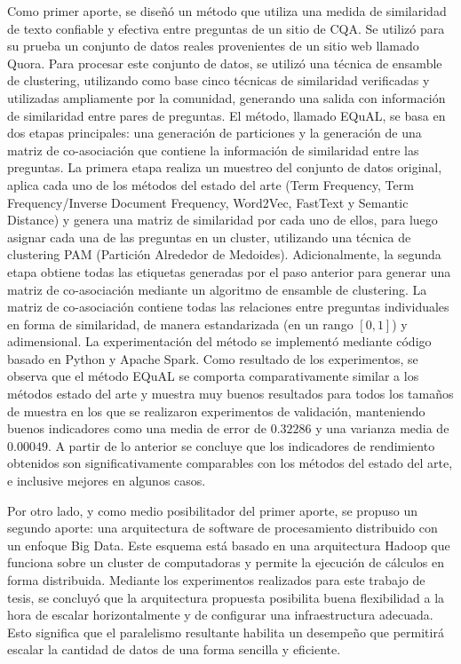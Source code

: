 \bigskip Como primer aporte, se diseñó un método que utiliza una medida de similaridad de texto confiable y efectiva entre preguntas de un sitio de CQA. Se utilizó para su prueba un conjunto de datos reales provenientes de un sitio web llamado Quora. Para procesar este conjunto de datos, se utilizó una técnica de ensamble de clustering, utilizando como base cinco técnicas de similaridad verificadas y utilizadas ampliamente por la comunidad, generando una salida con información de similaridad entre pares de preguntas. El método, llamado EQuAL, se basa en dos etapas principales: una generación de particiones y la generación de una matriz de co-asociación que contiene la información de similaridad entre las preguntas. La primera etapa realiza un muestreo del conjunto de datos original, aplica cada uno de los métodos del estado del arte (Term Frequency, Term Frequency/Inverse Document Frequency, Word2Vec, FastText y Semantic Distance) y genera una matriz de similaridad por cada uno de ellos, para luego asignar cada una de las preguntas en un cluster, utilizando una técnica de clustering PAM (Partición Alrededor de Medoides). Adicionalmente, la segunda etapa obtiene todas las etiquetas generadas por el paso anterior para generar una matriz de co-asociación mediante un algoritmo de ensamble de clustering. La matriz de co-asociación contiene todas las relaciones entre preguntas individuales en forma de similaridad, de manera estandarizada (en un rango \([0,1]\)) y adimensional. La experimentación del método se implementó mediante código basado en Python y Apache Spark. Como resultado de los experimentos, se observa que el método EQuAL se comporta comparativamente similar a los métodos estado del arte y muestra muy buenos resultados para todos los tamaños de muestra en los que se realizaron experimentos de validación, manteniendo buenos indicadores como una media de error de \(0.32286\) y una varianza media de \(0.00049\). A partir de lo anterior se concluye que los indicadores de rendimiento obtenidos son significativamente comparables con los métodos del estado del arte, e inclusive mejores en algunos casos.

\bigskip Por otro lado, y como medio posibilitador del primer aporte, se propuso un segundo aporte: una arquitectura de software de procesamiento distribuido con un enfoque Big Data. Este esquema está basado en una arquitectura Hadoop que funciona sobre un cluster de computadoras y permite la ejecución de cálculos en forma distribuida. Mediante los experimentos realizados para este trabajo de tesis, se concluyó que la arquitectura propuesta posibilita buena flexibilidad a la hora de escalar horizontalmente y de configurar una infraestructura adecuada. Esto significa que el paralelismo resultante habilita un desempeño que permitirá escalar la cantidad de datos de una forma sencilla y eficiente.

